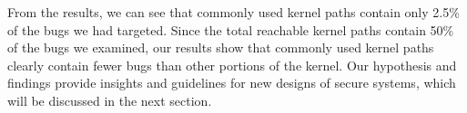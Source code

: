 From the results, we can see that commonly used kernel paths contain only
2.5\% of the bugs we had targeted. 
Since the total reachable kernel paths contain 50\% of the bugs we
examined, 
our results show that commonly used kernel paths clearly contain fewer bugs
than other portions of the kernel. 
Our hypothesis and findings provide insights and guidelines for new designs
of secure systems, 
which will be discussed in the next section. 




